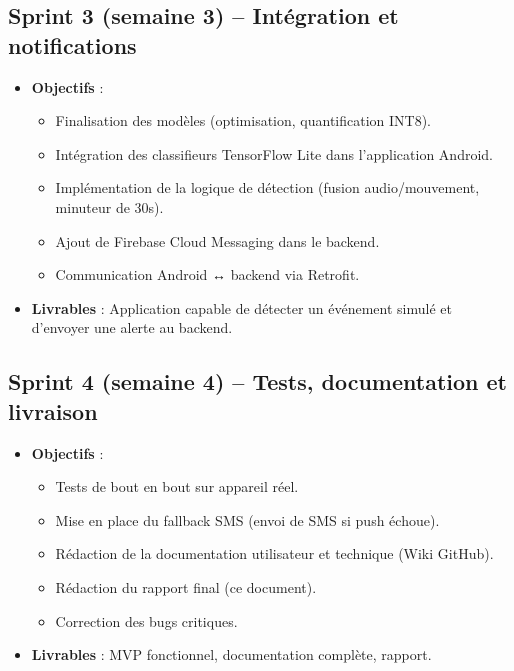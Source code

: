 \documentclass[11pt,a4paper]{article}
\begin{document}
\subsection{Sprint 3 (semaine 3) – Intégration et notifications}
\begin{itemize}
    \item \textbf{Objectifs} :
        \begin{itemize}
            \item Finalisation des modèles (optimisation, quantification INT8).
            \item Intégration des classifieurs TensorFlow Lite dans l’application Android.
            \item Implémentation de la logique de détection (fusion audio/mouvement, minuteur de 30s).
            \item Ajout de Firebase Cloud Messaging dans le backend.
            \item Communication Android ↔ backend via Retrofit.
        \end{itemize}
    \item \textbf{Livrables} : Application capable de détecter un événement simulé et d’envoyer une alerte au backend.
\end{itemize}

\subsection{Sprint 4 (semaine 4) – Tests, documentation et livraison}
\begin{itemize}
    \item \textbf{Objectifs} :
        \begin{itemize}
            \item Tests de bout en bout sur appareil réel.
            \item Mise en place du fallback SMS (envoi de SMS si push échoue).
            \item Rédaction de la documentation utilisateur et technique (Wiki GitHub).
            \item Rédaction du rapport final (ce document).
            \item Correction des bugs critiques.
        \end{itemize}
    \item \textbf{Livrables} : MVP fonctionnel, documentation complète, rapport.
\end{itemize}

\usepackage{pgfgantt}
\end{document}

